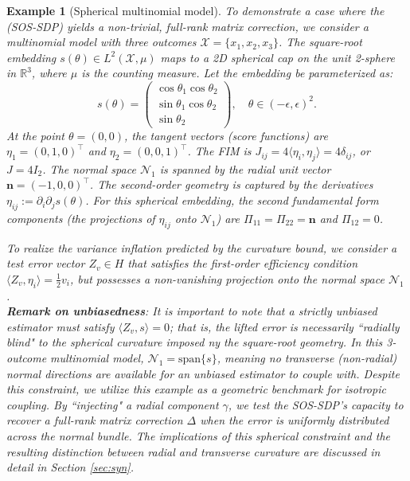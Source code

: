 \documentclass[pdflatex,sn-mathphys-num]{sn-jnl}%
\theoremstyle{thmstyleone}%
\theoremstyle{thmstyletwo}%
\newtheorem{example}{Example}%
\theoremstyle{thmstylethree}%
\begin{document}
\begin{example}[Spherical multinomial model]

To demonstrate a case where the (SOS-SDP) yields a non-trivial, full-rank matrix correction, we consider a multinomial model with three outcomes $\mathcal{X} = \{x_1, x_2, x_3\}$. The square-root embedding $s(\theta) \in L^2(\mathcal{X}, \mu)$ maps to a 2D spherical cap on the unit 2-sphere in $\mathbb{R}^3$, where $\mu$ is the counting measure. Let the embedding be parameterized as:
\[
s(\theta) = \begin{pmatrix} \cos \theta_1 \cos \theta_2 \\ \sin \theta_1 \cos \theta_2 \\ \sin \theta_2 \end{pmatrix}, \quad \theta \in (-\epsilon, \epsilon)^2.
\]
At the point $\theta = (0,0)$, the tangent vectors (score functions) are $\eta_1 = (0, 1, 0)^\top$ and $\eta_2 = (0, 0, 1)^\top$. The FIM is $J_{ij} = 4 \langle \eta_i, \eta_j \rangle = 4 \delta_{ij}$, or $J = 4 I_2$. The normal space $\mathcal{N}_1$ is spanned by the radial unit vector $\mathbf{n} = (-1, 0, 0)^\top$. The second-order geometry is captured by the derivatives $\eta_{ij} := \partial_i \partial_j s(\theta)$. For this spherical embedding, the second fundamental form components (the projections of $\eta_{ij}$ onto $\mathcal{N}_1$) are $\Pi_{11} = \Pi_{22} = \mathbf{n}$ and $\Pi_{12} = 0$.

To realize the variance inflation predicted by the curvature bound, we consider a test error vector $Z_v \in H$ that satisfies the first-order efficiency condition $\langle Z_v, \eta_i \rangle = \frac{1}{2} v_i$, but possesses a non-vanishing projection onto the normal space $\mathcal{N}_1$.\\
\textbf{Remark on unbiasedness}: It is important to note that a strictly unbiased estimator must satisfy $\langle Z_v, s \rangle = 0$; that is, the lifted error is necessarily ``radially blind" to the spherical curvature imposed ny the square-root geometry. In this 3-outcome multinomial model, $\mathcal{N}_1 = \text{span}\{s\}$, meaning no transverse (non-radial) normal directions are available for an unbiased estimator to couple with. Despite this constraint, we utilize this example as a geometric benchmark for isotropic coupling. By ``injecting" a radial component $\gamma$, we test the SOS-SDP's capacity to recover a full-rank matrix correction $\Delta$ when the error is uniformly distributed across the normal bundle. The implications of this spherical constraint and the resulting distinction between radial and transverse curvature are discussed in detail in Section \ref{sec:syn}.


\end{example}
\end{document}
